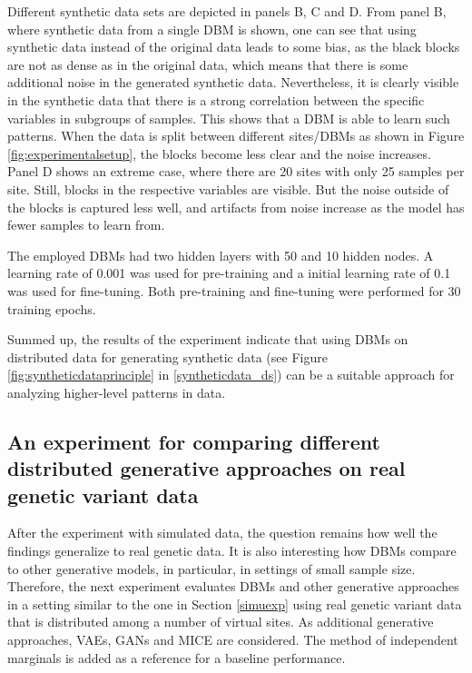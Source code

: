 \documentclass[12pt]{article}
\begin{document}
Different synthetic data sets are depicted in panels B, C and D.
From panel B, where synthetic data from a single DBM is shown, one can see that using synthetic data instead of the original data leads to some bias, as the black blocks are not as dense as in the original data, which means that there is some additional noise in the generated synthetic data.
Nevertheless, it is clearly visible in the synthetic data that there is a strong correlation between the specific variables in subgroups of samples.
This shows that a DBM is able to learn such patterns.
When the data is split between different sites/DBMs as shown in Figure \ref{fig:experimentalsetup}, the blocks become less clear and the noise increases.
Panel D shows an extreme case, where there are 20 sites with only 25 samples per site.
Still, blocks in the respective variables are visible.
But the noise outside of the blocks is captured less well, and artifacts from noise increase as the model has fewer samples to learn from.

The employed DBMs had two hidden layers with 50 and 10 hidden nodes.
A learning rate of 0.001 was used for pre-training and a initial learning rate of 0.1 was used for fine-tuning.
Both pre-training and fine-tuning were performed for 30 training epochs.

Summed up, the results of the experiment indicate that using DBMs on distributed data for generating synthetic data (see Figure \ref{fig:syntheticdataprinciple} in \ref{syntheticdata_ds}) can be a suitable approach for analyzing higher-level patterns in data.

\FloatBarrier
\subsection{An experiment for comparing different distributed generative approaches on real genetic variant data}\label{realexp}

After the experiment with simulated data, the question remains how well the findings generalize to real genetic data.
It is also interesting how DBMs compare to other generative models, in particular, in settings of small sample size.
Therefore, the next experiment evaluates DBMs and other generative approaches in a setting similar to the one in Section \ref{simuexp} using real genetic variant data that is distributed among a number of virtual sites.
As additional generative approaches, VAEs, GANs and MICE are considered.
The method of independent marginals is added as a reference for a baseline performance.
\end{document}
